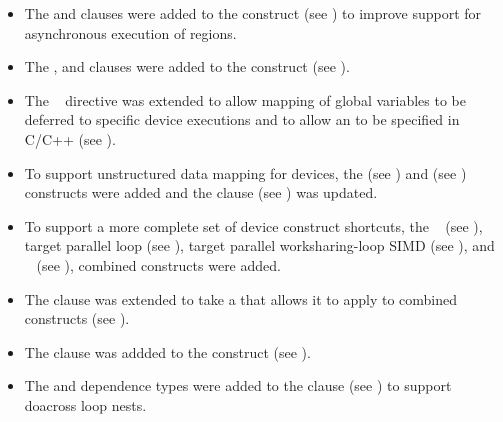 \begin{itemize}
\item The  and  clauses were added to the
       construct (see )
      to improve support for asynchronous execution of  regions.

\item The ,  and  clauses
      were added to the  construct (see ).

\item The ~ directive was extended to allow
      mapping of global variables to be deferred to specific device
      executions and to allow an 
      to be specified in C/C++ (see ).

\item To support unstructured data mapping for devices, the
       (see ) and  (see ) constructs were added and the  clause
      (see ) was updated.

\item To support a more complete set of device construct shortcuts, the
      ~
      (see ),
      target parallel loop
      (see ),
      target parallel worksharing-loop SIMD
      (see ),
      and ~
      (see ),
      combined constructs were added.

\item The  clause was extended to take a
       that allows it to apply
      to combined constructs (see ).

\item The  clause was addded to the  construct
      (see ).

\item The  and  dependence types were added to the
       clause (see ) to support
      doacross loop nests.


\end{itemize}
